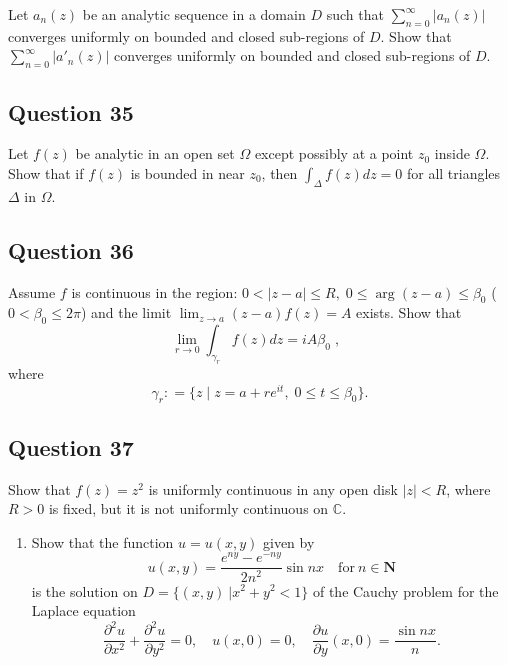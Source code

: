 \documentclass[12pt]{article}
\providecommand{\tightlist}{%
  \setlength{\itemsep}{0pt}\setlength{\parskip}{0pt}}
\begin{document}
Let \(a_n(z)\) be an analytic sequence in a domain \(D\) such that
\(\displaystyle \sum_{n=0}^\infty |a_n(z)|\) converges uniformly on
bounded and closed sub-regions of \(D\). Show that
\(\displaystyle \sum_{n=0}^\infty |a'_n(z)|\) converges uniformly on
bounded and closed sub-regions of \(D\).

\hypertarget{question-35-2}{%
\subsection{Question 35}\label{question-35-2}}

Let \(f(z)\) be analytic in an open set \(\Omega\) except possibly at a
point \(z_0\) inside \(\Omega\). Show that if \(f(z)\) is bounded in
near \(z_0\), then \(\displaystyle \int_\Delta f(z) dz = 0\) for all
triangles \(\Delta\) in \(\Omega\).

\hypertarget{question-36-2}{%
\subsection{Question 36}\label{question-36-2}}

Assume \(f\) is continuous in the region:
\(0< |z-a| \leq R, \; 0 \leq \arg(z-a) \leq \beta_0\)
(\(0 < \beta_0 \leq 2 \pi\)) and the limit
\(\displaystyle \lim_{z \rightarrow a} (z-a) f(z) = A\) exists. Show
that
\[\lim_{r \rightarrow 0} \int_{\gamma_r} f(z) dz  = i A \beta_0 \; , \; \;\]
where
\[\gamma_r : = \{ z \; | \; z = a + r e^{it}, \; 0 \leq  t \leq \beta_0 \}.\]

\hypertarget{question-37-2}{%
\subsection{Question 37}\label{question-37-2}}

Show that \(f(z) = z^2\) is uniformly continuous in any open disk
\(|z| < R\), where \(R>0\) is fixed, but it is not uniformly continuous
on \(\mathbb C\).

\begin{enumerate}
\def\labelenumi{(\arabic{enumi})}
\tightlist
\item
  Show that the function \(u=u(x,y)\) given by
  \[u(x,y)=\frac{e^{ny}-e^{-ny}}{2n^2}\sin nx\quad \text{for}\ n\in {\mathbf N}\]
  is the solution on \(D=\{(x,y)\ | x^2+y^2<1\}\) of the Cauchy problem
  for the Laplace equation
  \[\frac{\partial ^2u}{\partial x^2}+\frac{\partial ^2u}{\partial y^2}=0,\quad
  u(x,0)=0,\quad \frac{\partial u}{\partial y}(x,0)=\frac{\sin nx}{n}.\]
\end{enumerate}
\end{document}
